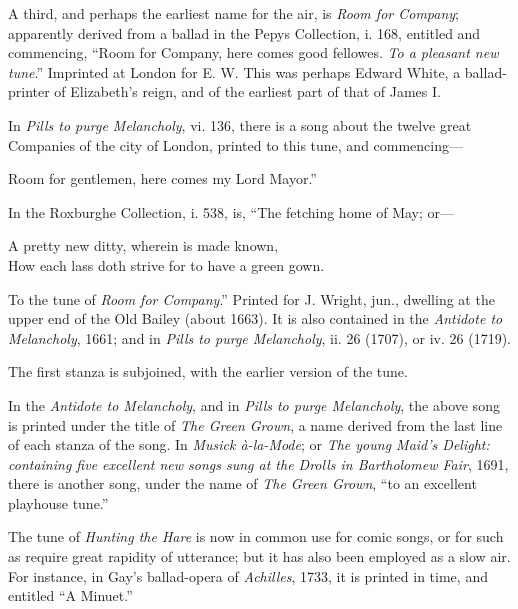 A third, and perhaps the earliest name for the air, is \textit{Room for Company};
apparently derived from a ballad in the Pepys Collection, i. 168, entitled and
commencing, “Room for Company, here comes good fellowes. \textit{To a pleasant new
tune}.” Imprinted at London for E. W. This was perhaps Edward White, a
ballad-printer of Elizabeth’s reign, and of the earliest part of that of James I.

In \textit{ Pills to purge Melancholy}, vi. 136, there is a song about the twelve great
Companies of the city of London, printed to this tune, and commencing—
\settowidth{\versewidth}{Room for gentlemen, here comes my Lord Mayor.”}
\begin{scverse}
Room for gentlemen, here comes my Lord Mayor.”
\end{scverse}

In the Roxburghe Collection, i. 538, is, “The fetching home of May; or—
\begin{scverse}
A pretty new ditty, wherein is made known,\\
How each lass doth strive for to have a green gown.
\end{scverse}

To the tune of \textit{Room for Company}.” \pagebreak Printed for J. Wright, jun., dwelling
at the upper end of the Old Bailey (about 1663). It is also contained in the \textit{Antidote to Melancholy}, 1661; and in \textit{ Pills to purge Melancholy}, ii. 26 (1707),
or iv. 26 (1719).

The first stanza is subjoined, with the earlier version of the tune.



In the \textit{Antidote to Melancholy}, and in \textit{ Pills to purge Melancholy}, the above song
is printed under the title of \textit{The Green Grown}, a name derived from the last line of 
each stanza of the song. In \textit{Musick à-la-Mode}; \pagebreak or \textit{The young Maid’s Delight:
containing five excellent new songs sung at the Drolls in Bartholomew Fair}, 1691,
there is another song, under the name of \textit{The Green Grown}, “to an excellent playhouse
tune.”

The tune of \textit{Hunting the Hare} is now in common use for comic songs, or for
such as require great rapidity of utterance; but it has also been employed as a
slow air. For instance, in Gay’s ballad-opera of \textit{Achilles}, 1733, it is printed
in  time, and entitled “A Minuet.”

